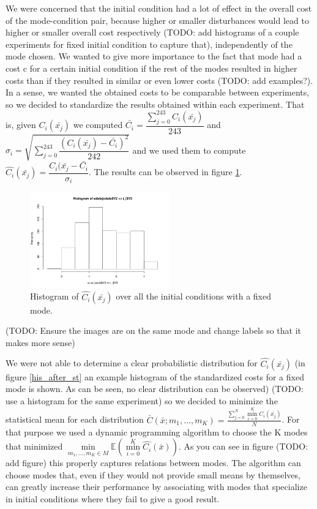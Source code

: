 \documentclass[12,twoside]{TFG-GM}
\theoremstyle{definition}
\theoremstyle{remark}
\newcommand*\mean[1]{\bar{#1}}
\newcommand*\diff[1]{\bar{#1}}
\begin{document}
We were concerned that the initial condition had a lot of effect in the overall cost of the mode-condition pair, because higher or smaller disturbances would lead to higher or smaller overall cost respectively (TODO: add histograms of a couple experiments for fixed initial condition to capture that), independently of the mode chosen. We wanted to give more importance to the fact that mode had a cost c for a certain initial condition if the rest of the modes resulted in higher costs than if they resulted in similar or even lower costs (TODO: add examples?). In a sense, we wanted the obtained costs to be comparable between experiments, so we decided to standardize the results obtained within each experiment. That is, given $C_i(\diff{x_j})$ we computed $\mean{C_i} = \dfrac{\sum\limits_{j = 0}^{243}{C_i(\diff{x_j})}}{243}$ and $\sigma_i = \sqrt{\sum\limits_{j=0}^{243}{\dfrac{(C_i(\diff{x_j}) - \diff{C_i})^2} {242}}}$ and we used them to compute $\hat{C_i}(\diff{x_j}) = \dfrac{C_i(\diff{x_j} - \diff{C_i}}{\sigma_i}$. The results can be observed in figure \ref{hist_after_st}.

\begin{figure}[htb!]
\begin{center}
\includegraphics[width=6cm]{standarization_single_mode.png}
\caption{\label{hist_after_st} \small Histogram of $\hat{C_i}(\diff{x_j})$ over all the initial conditions with a fixed mode.}
\end{center}
\end{figure}
(TODO: Ensure the images are on the same mode and change labels so that it makes more sense)

We were not able to determine a clear probabilistic distribution for $\hat{C_i}(\diff{x_j})$ (in figure \ref{his_after_st} an example histogram of the standardized costs for a fixed mode is shown. As can be seen, no clear distribution can be observed) (TODO: use a histogram for the same experiment) so we decided to minimize the statistical mean for each distribution $ \bar{C}(\diff{x}; m_1, ..., m_K) = \frac{\sum\limits_{j=0}^{N}{\min\limits_{i = 0}^{K}{C_i(\diff{x_j})}}}{N}$. For that purpose we used a dynamic programming algorithm to choose the K modes that minimized $\min\limits_{m_1, ..., m_K \in M}\mathbb{E}(\min\limits_{i = 0}^{K}{\hat{C_i}(\diff{x})})$. As you can see in figure (TODO: add figure) this properly captures relations between modes. The algorithm can choose modes that, even if they would not provide small means by themselves, can greatly increase their performance by associating with modes that specialize in initial conditions where they fail to give a good result.
\end{document}

